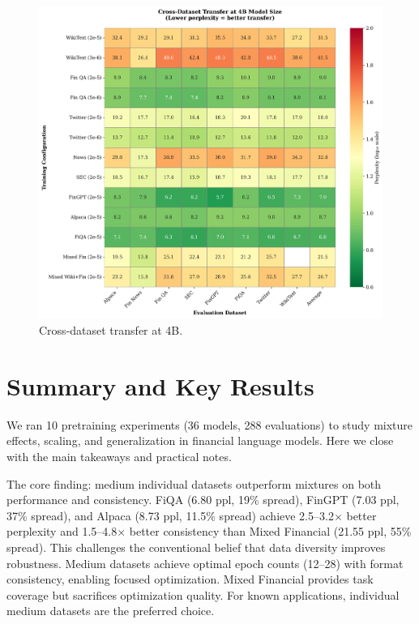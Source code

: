 \begin{figure}[htbp]
\centering
\includegraphics[width=\textwidth]{figures/heatmap_transfer.png}
\caption[Cross-Dataset Transfer at 4B]{Cross-dataset transfer at 4B.}
\label{fig:heatmap_transfer}
\end{figure}


















\section{Summary and Key Results}

We ran 10 pretraining experiments (36 models, 288 evaluations) to study mixture effects, scaling, and generalization in financial language models. Here we close with the main takeaways and practical notes.

The core finding: medium individual datasets outperform mixtures on both performance and consistency. FiQA (6.80 ppl, 19\% spread), FinGPT (7.03 ppl, 37\% spread), and Alpaca (8.73 ppl, 11.5\% spread) achieve 2.5–3.2$\times$ better perplexity and 1.5–4.8$\times$ better consistency than Mixed Financial (21.55 ppl, 55\% spread). This challenges the conventional belief that data diversity improves robustness. Medium datasets achieve optimal epoch counts (12–28) with format consistency, enabling focused optimization. Mixed Financial provides task coverage but sacrifices optimization quality. For known applications, individual medium datasets are the preferred choice.
